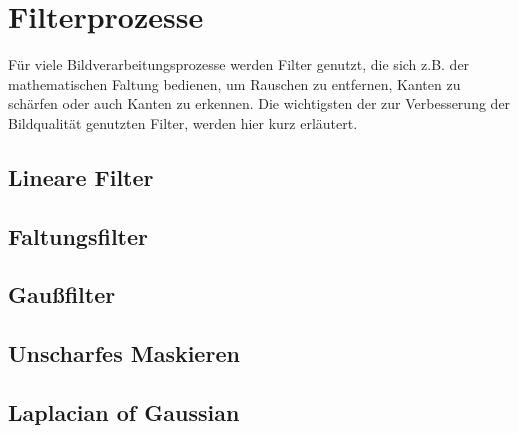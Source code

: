 \section{Filterprozesse}
\writtenby{\dcauthornameriren}%
Für viele Bildverarbeitungsprozesse werden Filter genutzt, die sich z.B. der mathematischen Faltung bedienen, um Rauschen zu entfernen, Kanten zu schärfen oder auch Kanten zu erkennen. Die wichtigsten der zur Verbesserung der Bildqualität genutzten Filter, werden hier kurz erläutert.

\subsection*{Lineare Filter}

\subsection*{Faltungsfilter}

\subsection*{Gaußfilter}

\subsection*{Unscharfes Maskieren}

\subsection*{Laplacian of Gaussian}
